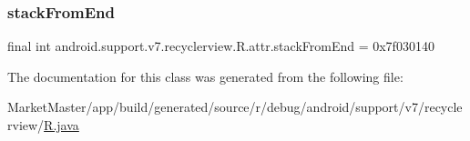 \mbox{\label{classandroid_1_1support_1_1v7_1_1recyclerview_1_1R_1_1attr_ad048157c30076371166ead7bb83de5f3}} 
\subsubsection{\texorpdfstring{stack\+From\+End}{stackFromEnd}}
{\footnotesize\ttfamily final int android.\+support.\+v7.\+recyclerview.\+R.\+attr.\+stack\+From\+End = 0x7f030140\hspace{0.3cm}{\ttfamily [static]}}



The documentation for this class was generated from the following file\+:\begin{DoxyCompactItemize}
\item 
Market\+Master/app/build/generated/source/r/debug/android/support/v7/recyclerview/\mbox{\hyperlink{debug_2android_2support_2v7_2recyclerview_2R_8java}{R.\+java}}\end{DoxyCompactItemize}
